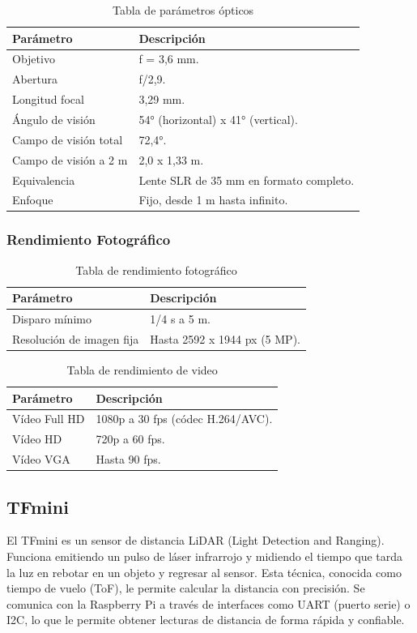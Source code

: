 \documentclass[12pt,a4paper]{article}
\begin{document}
\begin{table}[H]
\begin{tabular}{|p{4cm}|p{11cm}|}
\hline
\textbf{Parámetro} & \textbf{Descripción} \\ \hline
Objetivo & f = 3,6 mm. \\ \hline
Abertura & f/2,9. \\ \hline
Longitud focal & 3,29 mm. \\ \hline
Ángulo de visión & 54° (horizontal) x 41° (vertical). \\ \hline
Campo de visión total & 72,4°. \\ \hline
Campo de visión a 2 m & 2,0 x 1,33 m. \\ \hline
Equivalencia & Lente SLR de 35 mm en formato completo. \\ \hline
Enfoque & Fijo, desde 1 m hasta infinito. \\ \hline
\end{tabular}
\caption{Tabla de parámetros ópticos}
\end{table}

\subsubsection{Rendimiento Fotográfico}
\begin{table}[H]
\begin{tabular}{|p{4cm}|p{11cm}|}
\hline
\textbf{Parámetro} & \textbf{Descripción} \\ \hline
Disparo mínimo & 1/4 s a 5 m. \\ \hline
Resolución de imagen fija & Hasta 2592 x 1944 px (5 MP). \\ \hline
\end{tabular}
\caption{Tabla de rendimiento fotográfico}
\end{table}

\begin{table}[H]
\begin{tabular}{|p{4cm}|p{11cm}|}
\hline
\textbf{Parámetro} & \textbf{Descripción} \\ \hline
Vídeo Full HD & 1080p a 30 fps (códec H.264/AVC). \\ \hline
Vídeo HD & 720p a 60 fps. \\ \hline
Vídeo VGA & Hasta 90 fps. \\ \hline
\end{tabular}
\caption{Tabla de rendimiento de video}
\end{table}

\subsection{TFmini}
El TFmini es un sensor de distancia LiDAR (Light Detection and Ranging). Funciona emitiendo un pulso de láser infrarrojo y midiendo el tiempo que tarda la luz en rebotar en un objeto y regresar al sensor. Esta técnica, conocida como tiempo de vuelo (ToF), le permite calcular la distancia con precisión. Se comunica con la Raspberry Pi a través de interfaces como UART (puerto serie) o I2C, lo que le permite obtener lecturas de distancia de forma rápida y confiable.
\end{document}
